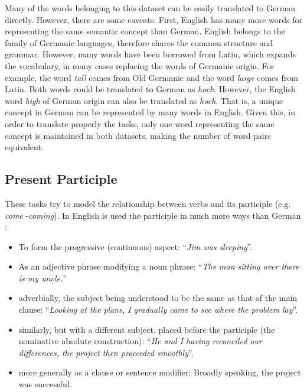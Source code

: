 Many of the words belonging to this dataset can be easily translated to
German directly. However, there are some caveats. First, English has many
more words for representing the same semantic concept than German.  English
belongs to the family of Germanic languages, therefore shares the common structure
and grammar. However, many words have been borrowed from Latin, which expands
the vocabulary, in many cases replacing  the words of Germanic origin. 
For example, the word \textit{tall}  comes from Old Germanic and  the
word \textit{large} comes from Latin. Both words could be translated to
German as \textit{hoch}. However, the English word  \textit{high} of German
origin can also be translated as \textit{hoch}. 
That is, a unique concept in German can be represented by many words in English. 
Given this, in order to translate properly the tasks, only one word representing 
the same concept is maintained in both datasets, making the number of word pairs equivalent.


%
\subsection{Present Participle}
\label{sec:sub_sec_present_participle}

These tasks try to model the relationship between verbs and its participle
(e.g. \textit{come} -\textit{coming}). In English is used the participle in
much more ways than German \cite{dictionaries1996american}: 

\begin{itemize}
\item  To form the progressive (continuous) aspect: ``\textit{Jim was sleeping}''.
\item As an   adjective phrase modifying a noun phrase: ``\textit{The man sitting over there is my
  uncle.}''
\item adverbially, the subject being understood to be the same as that
  of the main clause: ``\textit{Looking at the plans, I gradually came to see where the
  problem lay}''.
\item  similarly, but with a different subject, placed before the
  participle (the nominative absolute construction): ``\textit{He and I having
  reconciled our differences, the project then proceeded smoothly}''.
\item more
  generally as a clause or sentence modifier: Broadly speaking, the project
  was successful.

\end{itemize}

